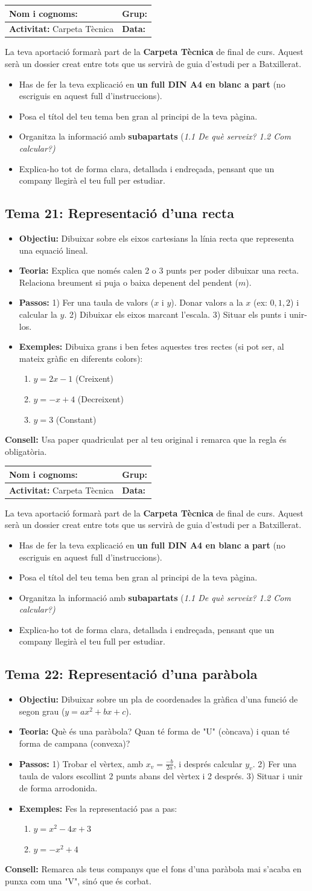 \documentclass[12pt,a4paper]{article}
\newcommand{\introcomuna}{
    \begin{tcolorbox}[colback=gray!5,colframe=gray!50!black,title=\textbf{La Carpeta Tècnica de Matemàtiques}]
    La teva aportació formarà part de la \textbf{Carpeta Tècnica} de final de curs. Aquest serà un dossier creat entre tots que us servirà de guia d'estudi per a Batxillerat.
    
    \begin{itemize}[label=\textbullet, leftmargin=*]
        \item Has de fer la teva explicació en \textbf{un full DIN A4 en blanc a part} (no escriguis en aquest full d'instruccions).
        \item Posa el títol del teu tema ben gran al principi de la teva pàgina.
        \item Organitza la informació amb \textbf{subapartats} (\textit{1.1 De què serveix? 1.2 Com calcular?)}
        \item Explica-ho tot de forma clara, detallada i endreçada, pensant que un company llegirà el teu full per estudiar.
    \end{itemize}
    \end{tcolorbox}
    \vspace{0.1cm}
}
\newcommand{\capcaleraalumne}[1]{
    \begingroup
    \renewcommand{\arraystretch}{2.2}
    \begin{tabularx}{\textwidth}{|X|p{4cm}|}
    \hline
    \textbf{Nom i cognoms:} & \textbf{Grup:} \\ \hline
    \textbf{Activitat:} Carpeta Tècnica & \textbf{Data:} \\ \hline
    \end{tabularx}
    \endgroup
    \vspace{0.4cm}
}
\begin{document}
\newpage
\capcaleraalumne{21}
\introcomuna
\subsection*{Tema 21: Representació d'una recta}
\begin{itemize}[label=\textbullet]
    \item \textbf{Objectiu:} Dibuixar sobre els eixos cartesians la línia recta que representa una equació lineal.
    \item \textbf{Teoria:} Explica que només calen 2 o 3 punts per poder dibuixar una recta. Relaciona breument si puja o baixa depenent del pendent ($m$).
    \item \textbf{Passos:} 1) Fer una taula de valors ($x$ i $y$). Donar valors a la $x$ (ex: $0, 1, 2$) i calcular la $y$. 2) Dibuixar els eixos marcant l'escala. 3) Situar els punts i unir-los.
    \item \textbf{Exemples:} Dibuixa grans i ben fetes aquestes tres rectes (si pot ser, al mateix gràfic en diferents colors):
    \begin{enumerate}[label=\alph*)]
        \item $y = 2x - 1$ \quad (Creixent)
        \item $y = -x + 4$ \quad (Decreixent)
        \item $y = 3$ \quad (Constant)
    \end{enumerate}
\end{itemize}
\vfill
\noindent\textbf{Consell:} Usa paper quadriculat per al teu original i remarca que la regla és obligatòria.

\newpage
\capcaleraalumne{22}
\introcomuna
\subsection*{Tema 22: Representació d'una paràbola}
\begin{itemize}[label=\textbullet]
    \item \textbf{Objectiu:} Dibuixar sobre un pla de coordenades la gràfica d'una funció de segon grau ($y=ax^2+bx+c$).
    \item \textbf{Teoria:} Què és una paràbola? Quan té forma de "U" (còncava) i quan té forma de campana (convexa)? 
    \item \textbf{Passos:} 
        1) Trobar el vèrtex, amb $x_v = \frac{-b}{2a}$, i després calcular $y_v$. 2) Fer una taula de valors escollint 2 punts abans del vèrtex i 2 després. 3) Situar i unir de forma arrodonida.
    \item \textbf{Exemples:} Fes la representació pas a pas:
    \begin{enumerate}[label=\alph*)]
        \item $y = x^2 - 4x + 3$
        \item $y = -x^2 + 4$
    \end{enumerate}
\end{itemize}
\vfill
\noindent\textbf{Consell:} Remarca als teus companys que el fons d'una paràbola mai s'acaba en punxa com una "V", sinó que és corbat.
\end{document}
